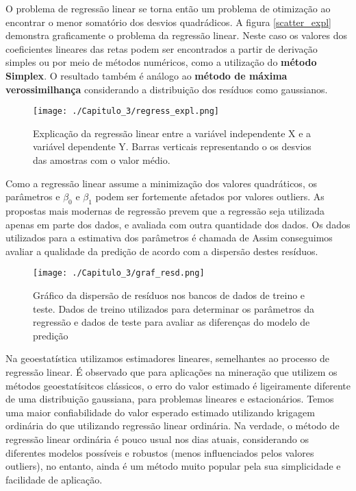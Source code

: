     
  O problema de regressão linear se torna então um problema de otimização ao encontrar o menor somatório dos desvios quadrádicos. A figura \eqref{scatter_expl} demonstra graficamente o problema da regressão linear. Neste caso os valores dos coeficientes lineares das retas podem ser encontrados a partir de derivação simples ou por meio de métodos numéricos, como a utilização do \textbf{método Simplex}. O resultado também é análogo ao \textbf{método de máxima verossimilhança} considerando a distribuição dos resíduos como gaussianos. 
  
\FloatBarrier  
\begin{figure}[!htbp]
  	\centering
  	\texttt{[image: ./Capitulo\_3/regress\_expl.png]}	
  	\caption{Explicação da regressão linear entre a variável independente X e a variável dependente Y. Barras verticais representando o os desvios das amostras com o valor médio. }
  	\label{scatter_expl}
\end{figure}
\FloatBarrier  

Como a regressão linear assume a minimização dos valores quadráticos, os parâmetros e $\beta_{0}$ e $\beta_{1}$ podem ser fortemente afetados por valores outliers. As propostas mais modernas de regressão prevem que a regressão seja utilizada apenas em parte dos dados, e avaliada com outra quantidade dos dados. Os dados utilizados para a estimativa dos parâmetros é chamada de  Assim conseguimos avaliar a qualidade da predição de acordo com a dispersão destes resíduos. 

\FloatBarrier
\begin{figure}[!htbp]
	\centering
	\texttt{[image: ./Capitulo\_3/graf\_resd.png]}	
	\caption{Gráfico da dispersão de resíduos nos bancos de dados de treino e teste. Dados de treino utilizados para determinar os parâmetros da regressão e dados de teste para avaliar as diferenças do modelo de predição }
	\label{scatter_expl}
\end{figure}
\FloatBarrier
   
Na geoestatística utilizamos estimadores lineares, semelhantes ao processo de regressão linear. É observado que para aplicações na mineração  que utilizem os métodos geoestatísitcos clássicos, o erro do valor estimado é ligeiramente diferente de uma distribuição gaussiana, para problemas lineares e estacionários. Temos uma maior confiabilidade do valor esperado estimado utilizando krigagem ordinária do que utilizando regressão linear ordinária. Na verdade, o método de regressão linear ordinária é pouco usual nos dias atuais, considerando os diferentes modelos possíveis e robustos (menos influenciados pelos valores outliers), no entanto, ainda é um método muito popular pela sua simplicidade e facilidade de aplicação.

